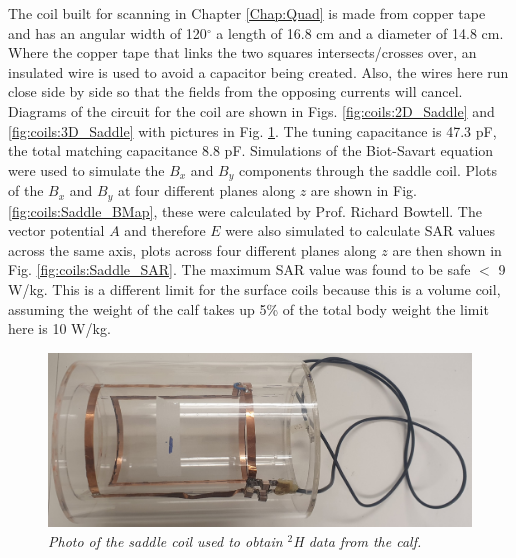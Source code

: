 The coil built for scanning in Chapter \ref{Chap:Quad} is made from copper tape and has an angular width of 120$^\circ$ a length of 16.8 cm and a diameter of 14.8 cm. Where the copper tape that links the two squares intersects/crosses over, an insulated wire is used to avoid a capacitor being created. Also, the wires here run close side by side so that the fields from the opposing currents will cancel. Diagrams of the circuit for the coil are shown in Figs. \ref{fig:coils:2D_Saddle} and \ref{fig:coils:3D_Saddle} with pictures in Fig. \ref{fig:coils:Saddle_pic}. The tuning capacitance is 47.3 pF, the total matching capacitance 8.8 pF. Simulations of the Biot-Savart equation were used to simulate the $B_x$ and $B_y$ components through the saddle coil. Plots of the $B_x$ and $B_y$ at four different planes along $z$ are shown in Fig. \ref{fig:coils:Saddle_BMap}, these were calculated by Prof. Richard Bowtell. The vector potential $A$ and therefore $E$ were also simulated to calculate \ac{SAR} values across the same axis, plots across four different planes along $z$ are then shown in Fig. \ref{fig:coils:Saddle_SAR}. The maximum \ac{SAR} value was found to be safe $<$ 9 W/kg. This is a different limit for the surface coils because this is a volume coil, assuming the weight of the calf takes up 5\% of the total body weight the limit here is 10 W/kg.

\begin{figure}[H]
    \centering
    \includegraphics[width=1\textwidth]{Figures/Coils/Saddle_Coil.jpg}
    \caption{\textit{Photo of the saddle coil used to obtain $^2$H data from the calf.}}
    \label{fig:coils:Saddle_pic}
\end{figure}

